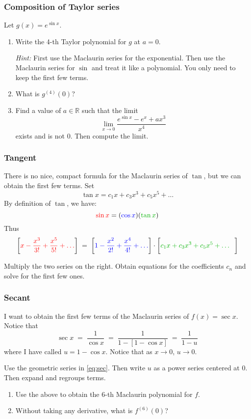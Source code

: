 \documentclass[14pt]{beamer}
\newcommand {\DS} [1] {${\displaystyle #1}$}
\newcommand {\R}{\mathbb{R}}
\newcommand{\p}{\pause}
\newcommand{\azul}[1]{{\color{blue} #1}}
\newcommand{\rojo}[1]{{\color{red} #1}}
\newcommand{\verde}[1]{{\color{verde} #1}}
\newcommand{\setsize}[1]{\fontsize{#1}{#1}\selectfont} %
\newcommand{\smallerfont}{\setsize{13}} %
\newcommand{\vv}{\vspace{.5cm}}
\newcommand{\vvv}{\vspace{.2cm}}
\begin{document}
\begin{frame}[t]
\smallerfont
\frametitle{Composition of Taylor series}

Let \DS{g(x) = e^{\sin x}}.
\vvv

	\begin{enumerate}
		\item Write the 4-th Taylor polynomial for $g$ at $a=0$.
		\vvv
		
		{\setsize{11}
			\emph{Hint:} First use the Maclaurin series for  the exponential.   Then use the Maclaurin series for $\sin$ and treat it like a polynomial.   You only need to keep the first few terms.
		}
		\vvv
		
\p		\item What is \DS{g^{(4)}(0)}?
		\vvv
		
\p		\item  Find a value of $a \in \R$ such that the limit
			$$\lim_{x \to 0} \frac{e^{\sin x} - e^x + ax^3 }{x^4}$$
			exists and is not 0.  Then compute the limit.
	\end{enumerate}

\end{frame}
\begin{frame}[t]
\smallerfont
\frametitle{Tangent}

There is no nice, compact formula for the Maclaurin series of $\tan$, but we can obtain the first few terms.  Set
	$$
		\tan x =  c_1 x +  c_3 x^3 +  c_5x^5 + \ldots
	$$
By definition of $\tan$, we have:
	$$
		\rojo{\sin x} = ( \azul{\cos x}) ( \verde{\tan x})
	$$
Thus
{\setsize{11}
	$$ 
		\left[ \rojo{ x - \frac{x^3}{3!} + \frac{x^5}{5!} + \ldots} \right] \; = \; \left[ \azul{1 - \frac{x^2}{2!} + \frac{x^4}{4!} + \ldots} \right] \cdot \left[ \verde{c_1 x + c_3 x^3 + c_5 x^5 + \ldots} \phantom{\frac 11}  \right]
	$$
}

Multiply the two series on the right.  Obtain equations for the coefficients $c_n$ and solve for the first few ones.

\end{frame}
\begin{frame}[t]
\smallerfont
\frametitle{Secant}

I want to obtain the first few terms of the Maclaurin series of \DS{f(x) = \sec x}.  Notice that
	\begin{equation} \label{eq:sec}
		\sec x \; = \; \frac{1}{\cos x} \; = \; \frac{1}{1 - \left[ 1 - \cos x\right]} \; = \; \frac{1}{1-u}
	\end{equation}
where I have called \DS{u = 1 - \cos x}.  \; Notice that as $x \to 0$, $u \to 0$.  
\vvv

Use the geometric series in \eqref{eq:sec}.  Then write $u$ as a power series centered at 0.  Then expand and regroups terms.
\vv

\begin{enumerate}
	\item  Use the above to obtain the 6-th Maclaurin polynomial for $f$.
\p	\item  Without taking any derivative, what is \DS{f^{(6)}(0)}?
\end{enumerate}

\end{frame}
\end{document}
